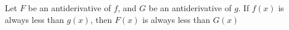 \documentclass{ximera}
\author{Steven Gubkin}
\begin{document}
\begin{exercise}



Let $F$ be an antiderivative of $f$, and $G$ be an antiderivative of $g$.  If $f(x)$ is always less than $g(x)$, then $F(x)$ is always less than $G(x)$

	\begin{multipleChoice}	
	\end{multipleChoice}

\end{exercise}
\end{document}
